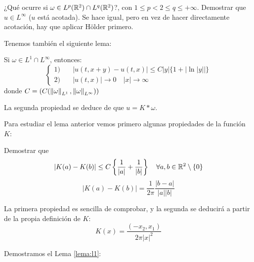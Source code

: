 \begin{ejercicio}
    ¿Qué ocurre si $\omega \in L^p(\mathbb{R}^2) \cap L^q(\mathbb{R}^2)$?, con $1 \leq p < 2 \leq q \leq +\infty$. Demostrar que $u \in L^\infty$ ($u$ está acotada). Se hace igual, 
    pero en vez de hacer directamente acotación, hay que aplicar Hölder primero. 
\end{ejercicio}


Tenemos también el siguiente lema:

\begin{lema}\label{lema:l1}
    Si $\omega \in L^1 \cap L^\infty$, entonces:
    $$\begin{cases}
        1)& \quad |u(t,x+y) - u(t,x)| \leq C |y| \{1 + |\ln|y||\} \\
        2)& \quad |u(t,x)| \to 0 \quad |x| \to \infty
    \end{cases}$$
    donde $C = (C(\left\lVert \omega \right\rVert_{L^1}, \left\lVert \omega \right\rVert_{L^\infty}))$
\end{lema}

\begin{observacion}
    La segunda propiedad se deduce de que $u = K \ast \omega$. \\
\end{observacion}

Para estudiar el lema anterior vemos primero algunas propiedades de la función $K$:

\begin{ejercicio}\label{ejercicio:ej31}
    Demostrar que 
    $$|K(a) - K(b)| \leq C \left\{ \dfrac{1}{|a|} + \dfrac{1}{|b|} \right\} \quad \forall a,b \in \mathbb{R}^2 \setminus \{0\}$$
    $$|K(a) - K(b)| = \dfrac{1}{2 \pi} \dfrac{|b-a|}{|a||b|}$$

    La primera propiedad es sencilla de comprobar, y la segunda se deducirá a partir de la propia definición de $K$:
    $$K(x) = \dfrac{(-x_2, x_1)}{2 \pi |x|^2}$$
\end{ejercicio}

Demostramos el Lema \ref{lema:l1}:

